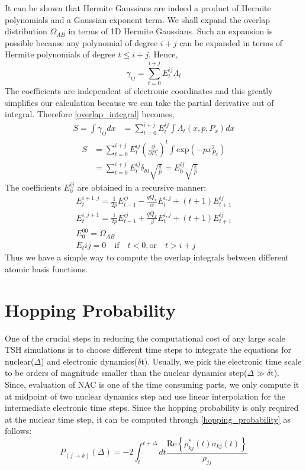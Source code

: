It can be shown that Hermite Gaussians are indeed a product of Hermite polynomials and a Gaussian exponent term. We shall expand the overlap distribution $\Omega_{AB}$ in terms of 1D Hermite Gaussians. Such an expansion is possible because any polynomial of degree $i+j$ can be expanded in terms of Hermite polynomials of degree $t\leq i+j$. Hence,
\begin{equation}
    \gamma_{ij} = \sum_{t=0}^{i+j}E^{ij}_t\Lambda_t
\end{equation}
The coefficients are independent of electronic coordinates and this greatly simplifies our calculation because we can take the partial derivative out of integral. Therefore \eqref{overlap_integral} becomes,\cite{overlap_goings}
\begin{align}
    S = \int\gamma_{ij}dx &= \sum_{t=0}^{i+j}E^{ij}_t\int \Lambda_t(x,p,P_x) dx
\end{align}
\begin{align}
     S &= \sum_{t=0}^{i+j}E^{ij}_t \left(\frac{\partial}{\partial P_x}\right)^t\int \text{exp}(-px_{P_x}^2) \nonumber\\
     &= \sum_{t=0}^{i+j}E^{ij}_t \delta_{t0}\sqrt{\frac{\pi}{p}} = E^{ij}_0 \sqrt{\frac{\pi}{p}}
\end{align}
The coefficients $E^{ij}_0$ are obtained in a recursive manner:
\begin{equation}\label{recursive_relations}
\begin{gathered}
    E^{i+1,j}_t = \frac{1}{2p}E^{ij}_{t-1} - \frac{qQ_x}{\alpha}E^{i,j}_t + (t+1)E^{ij}_{t+1} \\
    E^{i,j+1}_t = \frac{1}{2p}E^{ij}_{t-1} + \frac{qQ_x}{\beta}E^{i,j}_t + (t+1)E^{ij}_{t+1} \\
    E_0^{00} = \Omega_{AB} \\ 
    E_t{ij} = 0 \quad \text{if} \quad t<0, \text{or} \quad t > i+j 
\end{gathered}
\end{equation}
Thus we have a simple way to compute the overlap integrals between different atomic basis functions. 

\section{Hopping Probability}

One of the crucial steps in reducing the computational cost of any large scale TSH simulations is to choose different time steps to integrate the equations for nuclear($\Delta$) and electronic dynamics($\delta$t). Usually, we pick the electronic time scale to be orders of magnitude smaller than the nuclear dynamics step($\Delta \gg \delta\text{t}$). Since, evaluation of NAC is one of the time consuming parts, we only compute it at midpoint of two nuclear dynamics step and use linear interpolation for the intermediate electronic time steps. Since the hopping probability is only required at the nuclear time step, it can be computed through \eqref{hopping_probability} as follows\cite{Tully_2}:
\begin{equation}
    P_{(j\rightarrow k)}(\Delta) = -2 \int_t^{t+\Delta}dt\frac{\text{Re}\left\{\rho^*_{kj}(t)\sigma_{kj}(t)\right\}}{\rho_{jj}}
\end{equation}